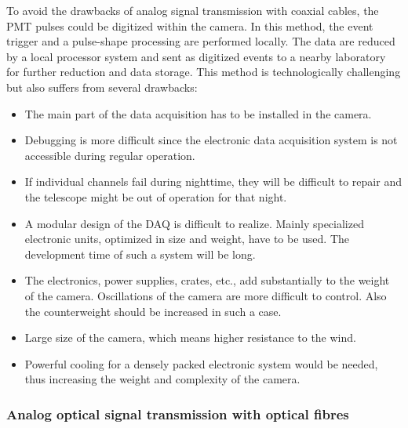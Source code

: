 \medskip To avoid the drawbacks of 
analog signal transmission with coaxial cables,
the PMT pulses could be digitized within the camera. In this method, the
event trigger and a pulse-shape processing are performed locally. The data
are reduced by a local processor system and sent as digitized events to a
nearby laboratory for further reduction and data storage. This method is
technologically challenging but also suffers from several drawbacks:

\begin{itemize}
\item  The main part of the data acquisition has to be installed in the
camera.

\item  Debugging is more difficult since the electronic data acquisition
system is not accessible during regular operation.

\item  If individual channels fail during nighttime, they will be difficult to repair
and the telescope might be out of operation for that night.

\item  A modular design of the DAQ is difficult to realize. Mainly
specialized electronic units, optimized in size and weight,
have to be used. The development time of
such a system will be long.

\item  The electronics, power supplies, crates, etc., add 
substantially to the weight of the camera. Oscillations
of the camera are more difficult to control. Also the counterweight
should be increased in such a case. 

\item Large size of the camera, which means higher resistance 
to the wind.

\item  Powerful cooling for a densely packed electronic system would be
needed, thus increasing the weight and complexity of the camera.
\end{itemize}

\subsubsection{Analog optical signal transmission with optical fibres}


